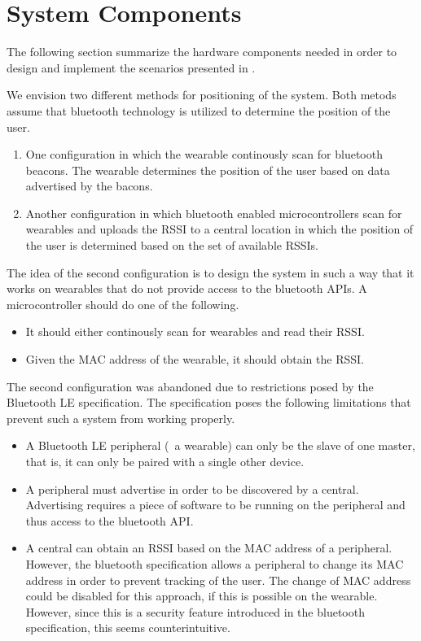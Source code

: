 \section{System Components}
\label{sec:analysis:system-components}

The following section summarize the hardware components needed in order to design and implement the scenarios presented in .

We envision two different methods for positioning of the system. Both metods assume that bluetooth technology is utilized to determine the position of the user. 

\begin{enumerate}
\item One configuration in which the wearable continously scan for bluetooth beacons. The wearable determines the position of the user based on data advertised by the bacons.
\item Another configuration in which bluetooth enabled microcontrollers scan for wearables and uploads the RSSI to a central location in which the position of the user is determined based on the set of available RSSIs.
\end{enumerate}

The idea of the second configuration is to design the system in such a way that it works on wearables that do not provide access to the bluetooth APIs. A microcontroller should do one of the following.

\begin{itemize}
\item It should either continously scan for wearables and read their RSSI.
\item Given the MAC address of the wearable, it should obtain the RSSI.
\end{itemize}

The second configuration was abandoned due to restrictions posed by the Bluetooth LE specification. The specification poses the following limitations that prevent such a system from working properly.

\begin{itemize}
\item A Bluetooth LE peripheral (\eg~a wearable) can only be the slave of one master, that is, it can only be paired with a single other device.
\item A peripheral must advertise in order to be discovered by a central. Advertising requires a piece of software to be running on the peripheral and thus access to the bluetooth API.
\item A central can obtain an RSSI based on the MAC address of a peripheral. However, the bluetooth specification allows a peripheral to change its MAC address in order to prevent tracking of the user\cite[p.~91]{bluetooth2010bluetooth_vol_1}. The change of MAC address could be disabled for this approach, if this is possible on the wearable. However, since this is a security feature introduced in the bluetooth specification, this seems counterintuitive.
\end{itemize}

